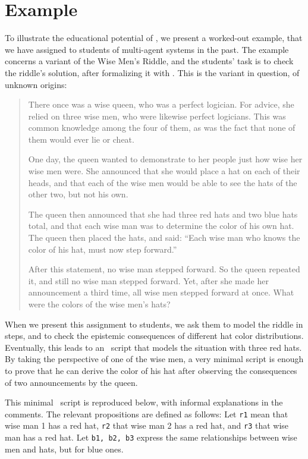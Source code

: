 \section{Example}
\label{sec:example}

To illustrate the educational potential of \oops\/, we present a worked-out example, that we have assigned to students of multi-agent systems in the past. The example concerns a variant of the Wise Men's Riddle, and the students' task is to check the riddle's solution, after formalizing it with \oops\/. This is the variant in question, of unknown origins:

\begin{quote}

There once was a wise queen, who was a perfect logician. For advice, she relied on three wise men, who were likewise perfect logicians. This was common knowledge among the four of them, as was the fact that none of them would ever lie or cheat.

One day, the queen wanted to demonstrate to her people just how wise her wise men were. She announced that she would place a hat on each of their heads, and that each of the wise men would be able to see the hats of the other two, but not his own.

The queen then announced that she had three red hats and two blue hats total, and that each wise man was to determine the color of his own hat. The queen then placed the hats, and said: \textquotedblleft Each wise man who knows the color of his hat, must now step forward.\textquotedblright

After this statement, no wise man stepped forward. So the queen repeated it, and still no wise man stepped forward. Yet, after she made her announcement a third time, all wise men stepped forward at once. What were the colors of the wise men's hats?

\end{quote}

When we present this assignment to students, we ask them to model the riddle in steps, and to check the epistemic consequences of different hat color distributions. Eventually, this leads to an \oops\  script that models the situation with three red hats. By taking the perspective of one of the wise men, a very minimal script is enough to prove that he can derive the color of his hat after observing the consequences of two announcements by the queen.

This minimal  \oops\  script is reproduced below, with informal explanations in the comments. The relevant propositions are defined as follows: Let {\tt r1} mean that wise man 1 has a red hat, {\tt r2} that wise man 2 has a red hat, and {\tt r3} that wise man has a red hat.  Let {\tt b1, b2, b3} express the same relationships between wise men and hats, but for blue ones.

